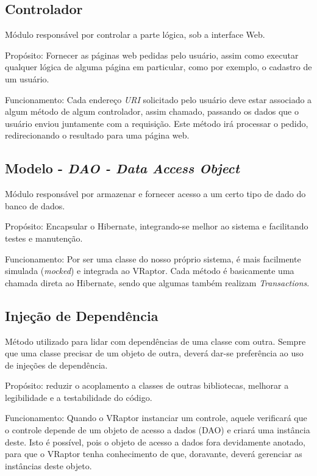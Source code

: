 \documentclass[11pt, a4paper]{article}
\begin{document}
        \subsection{Controlador}
            Módulo responsável por controlar a parte lógica, sob a interface Web.

            Propósito: Fornecer as páginas web pedidas pelo usuário, assim
			como executar qualquer lógica de alguma página em particular, como
			por exemplo, o cadastro de um usuário.

            Funcionamento: Cada endereço \emph{URI} solicitado pelo usuário deve estar associado
			a algum método de algum controlador, assim chamado, passando
			os dados que o usuário enviou juntamente com a requisição. Este método irá
			processar o pedido, redirecionando o resultado para uma página web.

        \subsection{Modelo - \textit{DAO - Data Access Object}}
            Módulo responsável por armazenar e fornecer acesso a um certo tipo de dado do
            banco de dados.

            Propósito: Encapsular o Hibernate, integrando-se melhor ao sistema
			e facilitando testes e manutenção.

            Funcionamento: Por ser uma classe do nosso próprio sistema, é mais
			facilmente simulada (\emph{mocked}) e integrada ao VRaptor.
			Cada método é basicamente uma chamada direta ao Hibernate, sendo que algumas
			também realizam \emph{Transactions}.

        \subsection{Injeção de Dependência}
            Método utilizado para lidar com dependências de uma classe com
            outra. Sempre que uma classe precisar de um objeto de outra,
            deverá dar-se preferência ao uso de injeções de dependência.

            Propósito: reduzir o acoplamento a classes de outras bibliotecas, melhorar a legibilidade e a testabilidade do código.

            Funcionamento: Quando o VRaptor instanciar um controle, aquele verificará que o controle depende de um objeto de acesso a dados (DAO) e criará uma instância deste. Isto é possível, pois o objeto de acesso a dados fora devidamente anotado, para que o VRaptor tenha conhecimento de que, doravante, deverá gerenciar as instâncias deste objeto.
\end{document}
